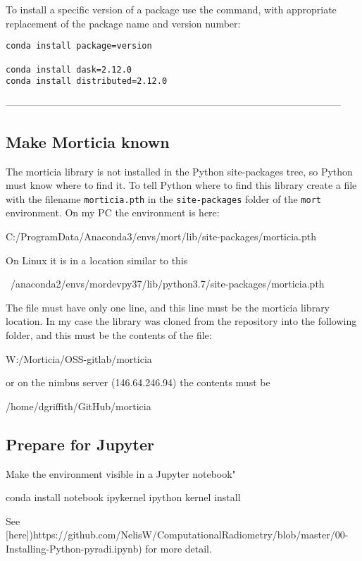 To install a specific version of a package use the command, with appropriate replacement of the package name and version number:
\begin{lstlisting}
conda install package=version

conda install dask=2.12.0
conda install distributed=2.12.0
\end{lstlisting}



------------------------------------------------------------------------------------------------------

\subsection{Make Morticia known}

The morticia library is not installed in the Python site-packages tree, so Python must know where to find it. To tell Python where to find this library create a file with the filename \lstinline{morticia.pth} in the \lstinline{site-packages} folder of the \lstinline{mort} environment. On my PC the environment is here: 

    C:/ProgramData/Anaconda3/envs/mort/lib/site-packages/morticia.pth

On Linux it is in a location similar to this

    ~/anaconda2/envs/mordevpy37/lib/python3.7/site-packages/morticia.pth

The file must have only one line, and this line must be the morticia library location.    In my case the library was cloned from the repository into the following folder, and this must be the contents of the file:

    W:/Morticia/OSS-gitlab/morticia

or on the nimbus server (146.64.246.94) the contents must be

    /home/dgriffith/GitHub/morticia



\subsection{Prepare for Jupyter}

Make the environment visible in a Jupyter notebook"

    conda install notebook ipykernel
    ipython kernel install

See [here])https://github.com/NelisW/ComputationalRadiometry/blob/master/00-Installing-Python-pyradi.ipynb) for more detail.




